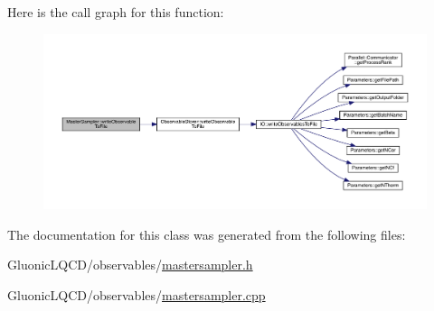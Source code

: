 Here is the call graph for this function\+:
\nopagebreak
\begin{figure}[H]
\begin{center}
\leavevmode
\includegraphics[width=350pt]{class_master_sampler_a638714c38e1a6252ab8b6be1fa224bd4_cgraph}
\end{center}
\end{figure}


The documentation for this class was generated from the following files\+:\begin{DoxyCompactItemize}
\item 
Gluonic\+L\+Q\+C\+D/observables/\mbox{\hyperlink{mastersampler_8h}{mastersampler.\+h}}\item 
Gluonic\+L\+Q\+C\+D/observables/\mbox{\hyperlink{mastersampler_8cpp}{mastersampler.\+cpp}}\end{DoxyCompactItemize}
